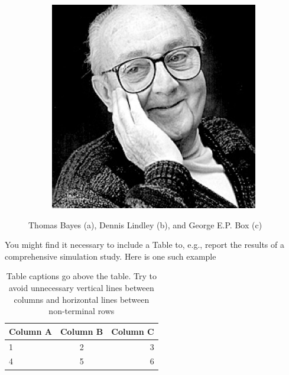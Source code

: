 \documentclass[12pt, twoside]{article}
\begin{document}
\begin{figure}[H]
\begin{subfigure}[b]{0.32\textwidth}
\caption{}
\label{fig:lindley}
\end{subfigure}
\begin{subfigure}[b]{0.32\textwidth}
\centering
\includegraphics[width = \textwidth]{box}
\caption{}
\label{fig:box}
\end{subfigure}
\caption{Thomas Bayes (a), Dennis Lindley (b), and George E.P. Box (c)}
\label{fig:multipart_figure}
\end{figure}


You might find it necessary to include a Table to, e.g., report the results of a comprehensive simulation study.
Here is one such example

\begin{table}[H]
\centering
\caption{Table captions go above the table. Try to avoid unnecessary vertical lines between columns and horizontal lines between non-terminal rows}
\label{tab:results}
\begin{tabular}{lcr} %
\hline
Column A & Column B & Column C \\ \hline
1 & 2 & 3 \\
4 & 5 & 6 \\ \hline
\end{tabular}
\end{table}
\end{document}
